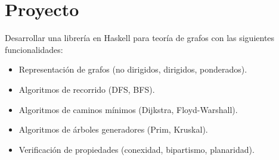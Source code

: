 \section{Proyecto}
Desarrollar una librería en Haskell para teoría de grafos con las siguientes funcionalidades:
\begin{itemize}
  \item Representación de grafos (no dirigidos, dirigidos, ponderados).
  \item Algoritmos de recorrido (DFS, BFS).
  \item Algoritmos de caminos mínimos (Dijkstra, Floyd-Warshall).
  \item Algoritmos de árboles generadores (Prim, Kruskal).
  \item Verificación de propiedades (conexidad, bipartismo, planaridad).
\end{itemize}